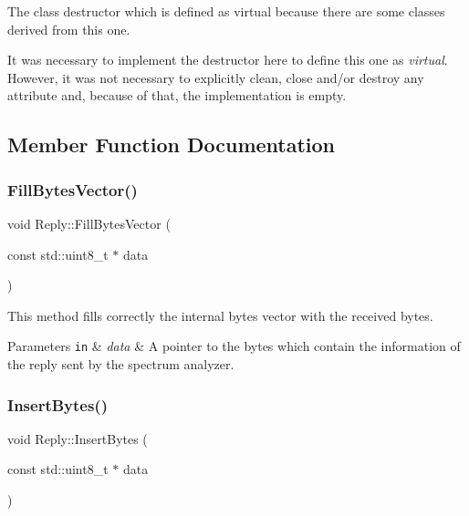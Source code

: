 The class destructor which is defined as virtual because there are some classes derived from this one. 

It was necessary to implement the destructor here to define this one as {\itshape virtual}. However, it was not necessary to explicitly clean, close and/or destroy any attribute and, because of that, the implementation is empty. 

\subsection{Member Function Documentation}
\mbox{\label{classReply_a8a6a68aeda60bfda6615272d2905a1ac}} 
\subsubsection{\texorpdfstring{Fill\+Bytes\+Vector()}{FillBytesVector()}}
{\footnotesize\ttfamily void Reply\+::\+Fill\+Bytes\+Vector (\begin{DoxyParamCaption}\item[{const std\+::uint8\+\_\+t $\ast$}]{data }\end{DoxyParamCaption})\hspace{0.3cm}{\ttfamily [protected]}}



This method fills correctly the internal bytes vector with the received bytes. 


\begin{DoxyParams}[1]{Parameters}
\mbox{\tt in}  & {\em data} & A pointer to the bytes which contain the information of the reply sent by the spectrum analyzer. \\
\hline
\end{DoxyParams}
\mbox{\label{classReply_a005fb1894b469cc16e69bf93fed967af}} 
\subsubsection{\texorpdfstring{Insert\+Bytes()}{InsertBytes()}}
{\footnotesize\ttfamily void Reply\+::\+Insert\+Bytes (\begin{DoxyParamCaption}\item[{const std\+::uint8\+\_\+t $\ast$}]{data }\end{DoxyParamCaption})\hspace{0.3cm}{\ttfamily [virtual]}}



